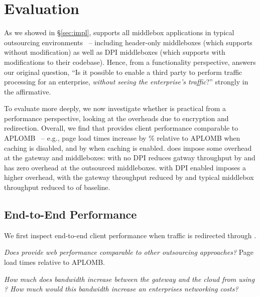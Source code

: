 
\section{Evaluation} \label{sec:eval}

As we showed in \S\ref{sec:impl}, \sys supports all middlebox applications in typical outsourcing environments~\cite{aplomb,nfv} -- including header-only middleboxes (which \sys supports without modification) as well as DPI middleboxes (which \sys supports with modifications to their codebase). 
Hence, from a functionality perspective, \sys answers our original question, ``Is it possible to enable a third party to perform traffic processing for an enterprise, {\em without seeing the enterprise's traffic}?''  strongly in the affirmative.

To evaluate \sys more deeply, we now investigate whether \sys is practical from a performance perspective, looking at the overheads due to encryption and redirection. 
Overall, we find that \sys provides client performance comparable to APLOMB~\cite{aplomb} -- e.g., page load times increase by \% relative to APLOMB when caching is disabled, and by  when caching is enabled.
\sys does impose some overhead at the gateway and middleboxes:
\sys with no DPI reduces gatway throughput by  and has zero overhead at the outsourced middleboxes. \sys with DPI enabled imposes a higher overhead, with the gateway throughput reduced by  and typical middlebox throughput reduced to  of baseline. 


\subsection{End-to-End Performance}
We first inspect end-to-end client performance when traffic is redirected through \sys.

{\it Does \sys provide web performance comparable to other outsourcing approaches?}
Page load times relative to APLOMB.

{\it How much does bandwidth increase between the gateway and the cloud from using \sys? How much would this bandwidth increase an enterprises networking costs?}



